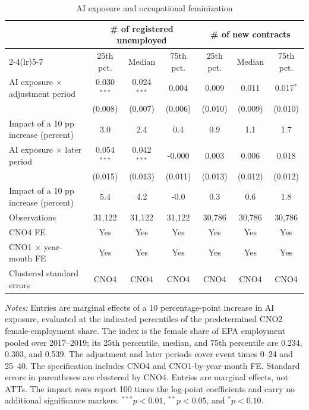 \begin{table}[!htbp]
\centering
\caption{AI exposure and occupational feminization}
\label{tab:v1_feminization_main}
\begin{threeparttable}
\scriptsize
\setlength{\tabcolsep}{3.5pt}
\begin{tabular}{lcccccc}
\toprule
& \multicolumn{3}{c}{\# of registered unemployed} & \multicolumn{3}{c}{\# of new contracts} \\
\cmidrule(lr){2-4}\cmidrule(lr){5-7}
& 25th pct. & Median & 75th pct. & 25th pct. & Median & 75th pct. \\
\midrule
AI exposure $\times$ adjustment period & 0.030$^{***}$ & 0.024$^{***}$ & 0.004 & 0.009 & 0.011 & 0.017$^{*}$ \\
 & (0.008) & (0.007) & (0.006) & (0.010) & (0.009) & (0.010) \\
Impact of a 10 pp increase (percent) & 3.0 & 2.4 & 0.4 & 0.9 & 1.1 & 1.7 \\
\addlinespace
AI exposure $\times$ later period & 0.054$^{***}$ & 0.042$^{***}$ & -0.000 & 0.003 & 0.006 & 0.018 \\
 & (0.015) & (0.013) & (0.011) & (0.013) & (0.012) & (0.012) \\
Impact of a 10 pp increase (percent) & 5.4 & 4.2 & -0.0 & 0.3 & 0.6 & 1.8 \\
\addlinespace
Observations & 31,122 & 31,122 & 31,122 & 30,786 & 30,786 & 30,786 \\
CNO4 FE & Yes & Yes & Yes & Yes & Yes & Yes \\
CNO1 $\times$ year-month FE & Yes & Yes & Yes & Yes & Yes & Yes \\
Clustered standard errors & CNO4 & CNO4 & CNO4 & CNO4 & CNO4 & CNO4 \\
\bottomrule
\end{tabular}
\begin{tablenotes}[flushleft]
\footnotesize
\item \emph{Notes:} Entries are marginal effects of a 10 percentage-point increase in AI exposure, evaluated at the indicated percentiles of the predetermined CNO2 female-employment share. The index is the female share of EPA employment pooled over 2017--2019; its 25th percentile, median, and 75th percentile are 0.234, 0.303, and 0.539. The adjustment and later periods cover event times 0--24 and 25--40. The specification includes CNO4 and CNO1-by-year-month FE. Standard errors in parentheses are clustered by CNO4. Entries are marginal effects, not ATTs. The impact rows report 100 times the log-point coefficients and carry no additional significance markers. $^{***}p<0.01$, $^{**}p<0.05$, and $^{*}p<0.10$.
\end{tablenotes}
\end{threeparttable}
\end{table}
